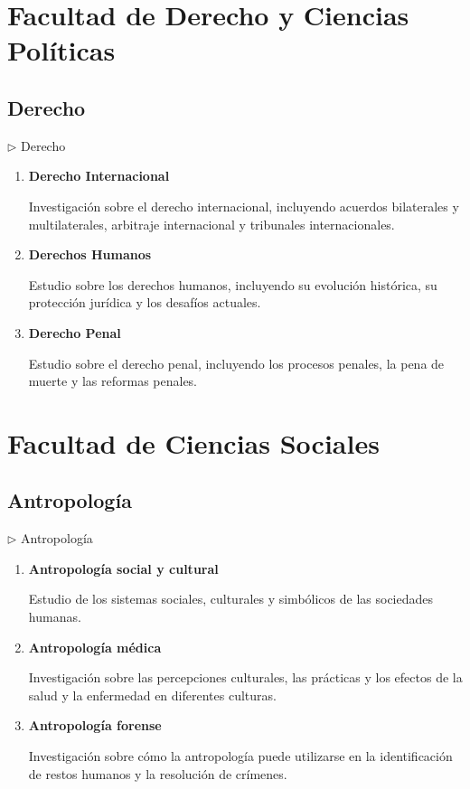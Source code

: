\documentclass[12pt,a4paper]{article}
\begin{document}
\section{Facultad de Derecho y Ciencias Políticas}

\subsection{Derecho}

\begin{careerbox}{$\triangleright$ Derecho}
	\begin{enumerate}
		\item \textbf{Derecho Internacional}
		
		Investigación sobre el derecho internacional, incluyendo acuerdos bilaterales y multilaterales, arbitraje internacional y tribunales internacionales.
		
		\item \textbf{Derechos Humanos}
		
		Estudio sobre los derechos humanos, incluyendo su evolución histórica, su protección jurídica y los desafíos actuales.
		
		\item \textbf{Derecho Penal}
		
		Estudio sobre el derecho penal, incluyendo los procesos penales, la pena de muerte y las reformas penales.
	\end{enumerate}
\end{careerbox}

\section{Facultad de Ciencias Sociales }

\subsection{Antropología}

\begin{careerbox}{$\triangleright$ Antropología}
	\begin{enumerate}
		\item \textbf{Antropología social y cultural}
		
		Estudio de los sistemas sociales, culturales y simbólicos de las sociedades humanas.
		
		\item \textbf{Antropología médica}
		
		Investigación sobre las percepciones culturales, las prácticas y los efectos de la salud y la enfermedad en diferentes culturas.
		
		\item \textbf{Antropología forense}
		
		Investigación sobre cómo la antropología puede utilizarse en la identificación de restos humanos y la resolución de crímenes.
	\end{enumerate}
\end{careerbox}
\end{document}
